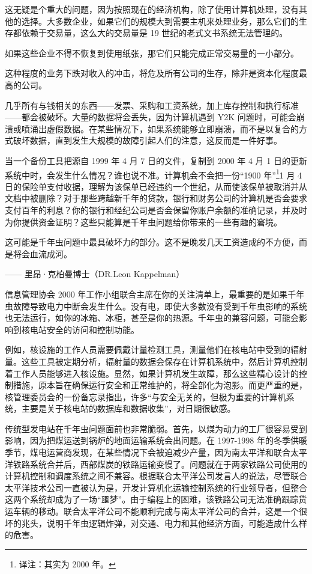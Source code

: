 这无疑是个重大的问题，因为按照现在的经济机构，除了使用计算机处理，没有其他的选择。大多数企业，如果它们的规模大到需要主机来处理业务，那么它们的生存都依赖于交易量，这么大的交易量是 19 世纪的老式文书系统无法管理的。


如果这些企业不得不恢复到使用纸张，那它们只能完成正常交易量的一小部分。


这种程度的业务下跌对收入的冲击，将危及所有公司的生存，除非是资本化程度最高的公司。


几乎所有与钱相关的东西——发票、采购和工资系统，加上库存控制和执行标准——都会被破坏。大量的数据将会丢失，因为计算机遇到 Y2K 问题时，可能会崩溃或喷涌出虚假数据。在某些情况下，如果系统能够立即崩溃，而不是以复合的方式破坏数据，直到发生大规模的故障引起人们的注意，这反而是一件好事。


当一个备份工具把源自 1999 年 4 月 7 日的文件，复制到 2000 年 4 月 1 日的更新系统中时，会发生什么情况？谁也说不准。计算机会不会把一份“1900 年”\footnote{译注：其实为 2000 年。}1 月 4 日的保险单支付收据，理解为该保单已经违约一个世纪，从而使该保单被取消并从文档中被删除？对于那些跨越新千年的贷款，银行和财务公司的计算机是否会要求支付百年的利息？你的银行和经纪公司是否会保留你账户余额的准确记录，并及时为你提供资金证明？这些只能算是千年虫问题给你带来的一些有趣的窘境。


\begin{tcolorbox}
\kaishu 这可能是千年虫问题中最具破坏力的部分。这不是晚发几天工资造成的不方便，而是将会血流成河。
\begin{flushright}
—— 里昂·克柏曼博士（DR.Leon Kappelman）
\end{flushright}
\end{tcolorbox}

信息管理协会 2000 年工作小组联合主席在你的关注清单上，最重要的是如果千年虫故障导致电力中断会发生什么。没有电，即使大多数没有受到千年虫影响的系统也无法运行，如你的冰箱、冰柜，甚至是你的热源。千年虫的兼容问题，可能会影响到核电站安全的访问和控制功能。


例如，核设施的工作人员需要佩戴计量检测工具，测量他们在核电站中受到的辐射量。这些工具被定期分析，辐射量的数据会保存在计算机系统中，然后计算机控制着工作人员能够进入核设施。显然，如果计算机发生故障，那么这些精心设计的控制措施，原本旨在确保运行安全和正常维护的，将全部化为泡影。而更严重的是，核管理委员会的一份备忘录指出，许多“与安全无关的，但极为重要的计算机系统，主要是关于核电站的数据库和数据收集”，对日期很敏感。


传统型发电站在千年虫问题面前也非常脆弱。首先，以煤为动力的工厂很容易受到影响，因为把煤运送到锅炉的地面运输系统会出问题。在 1997-1998 年的冬季供暖季节，煤电运营商发现，在某些情况下会被迫减少产量，因为南太平洋和联合太平洋铁路系统合并后，西部煤炭的铁路运输变慢了。问题就在于两家铁路公司使用的计算机控制和调度系统之间不兼容。根据联合太平洋公司发言人的说法，尽管联合太平洋技术公司一直被认为是，开发计算机化运输控制系统的行业领导者，但整合这两个系统却成为了一场“噩梦”。由于编程上的困难，该铁路公司无法准确跟踪货运车辆的移动。联合太平洋公司不能顺利完成与南太平洋公司的合并，这是一个很坏的兆头，说明千年虫逻辑炸弹，对交通、电力和其他经济方面，可能造成什么样的危害。


